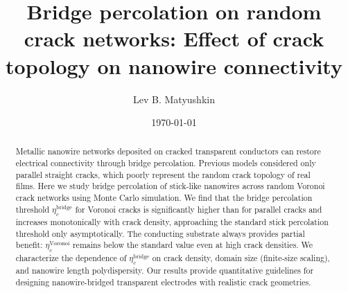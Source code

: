 \documentclass[aps,pre,reprint,amsmath,amssymb,superscriptaddress]{revtex4-2}
\begin{document}
\title{Bridge percolation on random crack networks: Effect of crack topology on nanowire connectivity}

\author{Lev B. Matyushkin}


\date{\today}

\begin{abstract}
Metallic nanowire networks deposited on cracked transparent conductors
can restore electrical connectivity through bridge percolation.
Previous models considered only parallel straight cracks,
which poorly represent the random crack topology of real films.
Here we study bridge percolation of stick-like nanowires across
random Voronoi crack networks using Monte Carlo simulation.
We find that the bridge percolation threshold $\eta_c^\mathrm{bridge}$
for Voronoi cracks is significantly higher than for parallel cracks
and increases monotonically with crack density, approaching the
standard stick percolation threshold only asymptotically.
The conducting substrate always provides partial benefit:
$\eta_c^\mathrm{Voronoi}$ remains below the standard value
even at high crack densities.
We characterize the dependence of $\eta_c^\mathrm{bridge}$
on crack density, domain size (finite-size scaling),
and nanowire length polydispersity.
Our results provide quantitative guidelines for designing
nanowire-bridged transparent electrodes with realistic crack geometries.
\end{abstract}

\maketitle




\end{document}
